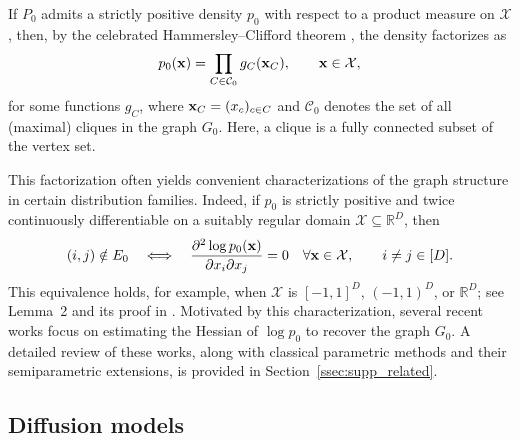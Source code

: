 \documentclass[11pt,a4paper,final]{article}
\numberwithin{equation}{section}
\theoremstyle{remark}
\def\cC{\mathcal C}
\def\cX{\mathcal X}
\newcommand{\bff}{{\bf f}}
\newcommand{\bx}{{\bf x}}
\newcommand{\bbR}{{\mathbb R}}
\newcommand{\be}{\begin{equation}}
\newcommand{\ee}{\end{equation}}
\begin{document}
If $P_0$ admits a strictly positive density $p_{0}$ with respect to a product measure on $\cX$, then, by the celebrated Hammersley--Clifford theorem \citep{hammersley1971markov, lauritzen1996graphical}, the density factorizes as
\be
p_{0}(\bx) = \prod_{C \in \cC_{0}} g_{C}(\bx_{C}), \qquad \bx \in \cX,
\label{eq:factorization}
\ee
for some functions $g_{C}$, where $\bx_{C} = (x_{c})_{c \in C}$ and $\cC_{0}$ denotes the set of all (maximal) cliques in the graph $G_{0}$.
Here, a clique is a fully connected subset of the vertex set.

This factorization often yields convenient characterizations of the graph structure in certain distribution families.
Indeed, if $p_{0}$ is strictly positive and twice continuously differentiable on a suitably regular domain $\cX \subseteq \bbR^{D}$, then
\be
(i,j) \notin E_{0}
\quad\Longleftrightarrow\quad
\frac{\partial^2 \log p_{0}(\bx) }{\partial x_i \partial x_j}=0
\quad \forall \bx \in \cX,
\qquad i \neq j \in [D].
\label{eq:iff_cond}
\ee 
This equivalence holds, for example, when $\cX$ is $[-1,1]^D$, $(-1,1)^D$, or $\bbR^D$; see Lemma~2 and its proof in \cite{spantini2018inference}.
Motivated by this characterization, several recent works \citep{zheng2023generalized, baptista2024learning, liaw2025learning} focus on estimating the Hessian of $\log p_{0}$ to recover the graph $G_{0}$.
A detailed review of these works, along with classical parametric methods and their semiparametric extensions, is provided in Section~\ref{ssec:supp_related}.



\subsection{Diffusion models}
\label{ssec:prelim_diffusion}

\end{document}
